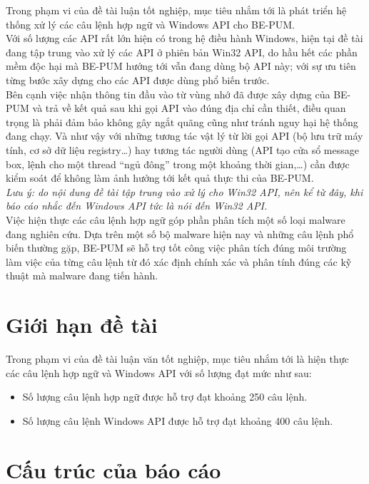 Trong phạm vi của đề tài luận tốt nghiệp, mục tiêu nhắm tới là phát triển hệ thống xử lý các câu lệnh hợp ngữ và Windows API cho BE-PUM.\\

Với số lượng các API rất lớn hiện có trong hệ điều hành Windows, hiện tại đề tài đang tập trung vào xử lý các API ở phiên bản Win32 API, do hầu hết các phần mềm độc hại mà BE-PUM hướng tới vẫn đang dùng bộ API này; với sự ưu tiên từng bước xây dựng cho các API được dùng phổ biến trước.\\

Bên cạnh việc nhận thông tin đầu vào từ vùng nhớ đã được xây dựng của BE-PUM và trả về kết quả sau khi gọi API vào đúng địa chỉ cần thiết, điều quan trọng là phải đảm bảo không gây ngắt quãng cũng như tránh nguy hại hệ thống đang chạy.
Và như vậy với những tương tác vật lý từ lời gọi API (bộ lưu trữ máy tính, cơ sở dữ liệu registry…) hay tương tác người dùng (API tạo cửa sổ message box, lệnh cho một thread “ngủ đông” trong một khoảng thời gian,…) cần được kiểm soát để không làm ảnh hưởng tới kết quả thực thi của BE-PUM.\\

\textit{Lưu ý: do nội dung đề tài tập trung vào xử lý cho Win32 API, nên kể từ đây, khi báo cáo nhắc đến Windows API tức là nói đến Win32 API.}\\

Việc hiện thực các câu lệnh hợp ngữ góp phần phân tích một số loại malware đang nghiên cứu. Dựa trên một số bộ malware hiện nay và những câu lệnh phổ biến thường gặp, BE-PUM sẽ hỗ trợ tốt công việc phân tích đúng môi trường làm việc của từng câu lệnh từ đó xác định chính xác và phân tính đúng các kỹ thuật mà malware đang tiến hành.

\section{Giới hạn đề tài}

Trong phạm vi của đề tài luận văn tốt nghiệp, mục tiêu nhắm tới là hiện thực các câu lệnh hợp ngữ và Windows API với số lượng đạt mức như sau:

\begin{itemize}
  \item Số lượng câu lệnh hợp ngữ được hỗ trợ đạt khoảng 250 câu lệnh.
  \item Số lượng câu lệnh Windows API được hỗ trợ đạt khoảng 400 câu lệnh.
\end{itemize}

\section{Cấu trúc của báo cáo}

